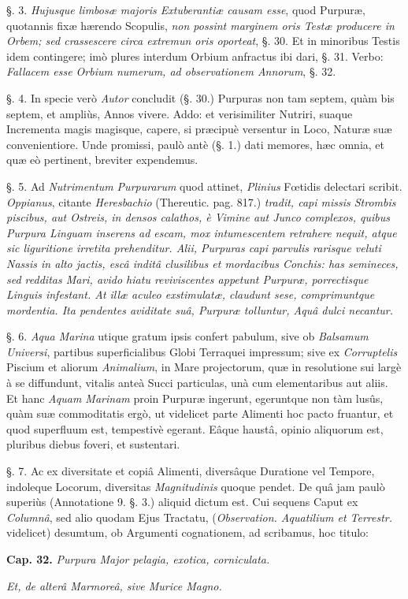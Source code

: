 \documentclass[a4paper, 11pt, oneside, polutonikogreek, german]{article}
\begin{document}
§. 3. \emph{Hujusque limbosæ majoris Extuberantiæ causam esse}, quod Purpuræ, quotannis fixæ hærendo Scopulis, \emph{non possint marginem oris Testæ producere in Orbem; sed crassescere circa extremun oris oporteat}, §. 30. Et in minoribus Testis idem contingere; imò plures interdum Orbium anfractus ibi dari, §. 31. Verbo: \emph{Fallacem esse Orbium numerum, ad observationem Annorum}, §. 32.

§. 4. In specie verò \emph{Autor} concludit (§. 30.) Purpuras non tam septem, quàm bis septem, et ampliùs, Annos vivere. Addo: et verisimiliter Nutriri, suaque Incrementa magis magisque, capere, si præcipuè versentur in Loco, Naturæ suæ convenientiore. Unde promissi, paulò antè (§. 1.) dati memores, hæc omnia, et quæ eò pertinent, breviter expendemus.

§. 5. Ad \emph{Nutrimentum Purpurarum} quod attinet, \emph{Plinius} Fœtidis delectari scribit. \emph{Oppianus}, citante \emph{Heresbachio} (Thereutic. pag. 817.) \emph{tradit, capi missis Strombis piscibus, aut Ostreis, in densos calathos, è Vimine aut Junco complexos, quibus Purpura Linguam inserens ad escam, mox intumescentem retrahere nequit, atque sic liguritione irretita prehenditur. Alii, Purpuras capi parvulis rarisque veluti Nassis in alto jactis, escâ inditâ clusilibus et mordacibus Conchis: has semineces, sed redditas Mari, avido hiatu reviviscentes appetunt Purpuræ, porrectisque Linguis infestant. At illæ aculeo exstimulatæ, claudunt sese, comprimuntque mordentia. Ita pendentes aviditate suâ, Purpuræ tolluntur, Aquâ dulci necantur.}

§. 6. \emph{Aqua Marina} utique gratum ipsis confert pabulum, sive ob \emph{Balsamum Universi}, partibus superficialibus Globi Terraquei impressum; sive ex \emph{Corruptelis} Piscium et aliorum \emph{Animalium}, in Mare projectorum, quæ in resolutione sui largè à se diffundunt, vitalis anteà Succi particulas, unà cum elementaribus aut aliis. Et hanc \emph{Aquam Marinam} proin Purpuræ ingerunt, egeruntque non tàm lusûs, quàm suæ commoditatis ergò, ut videlicet parte Alimenti hoc pacto fruantur, et quod superfluum est, tempestivè egerant. Eâque haustâ, opinio aliquorum est, pluribus diebus foveri, et sustentari.

§. 7. Ac ex diversitate et copiâ Alimenti, diversâque Duratione vel Tempore, indoleque Locorum, diversitas \emph{Magnitudinis} quoque pendet. De quâ jam paulò superiùs (Annotatione 9. §. 3.) aliquid dictum est. Cui sequens Caput ex \emph{Columnâ}, sed alio quodam Ejus Tractatu, (\emph{Observation. Aquatilium et Terrestr.} videlicet) desumtum, ob Argumenti cognationem, ad scribamus, hoc titulo:
\begin{center}
\textbf{Cap. 32.} \emph{Purpura Major pelagia, exotica, corniculata.}

\emph{Et, de alterâ Marmoreâ, sive Murice Magno.}
\end{center}
\end{document}
